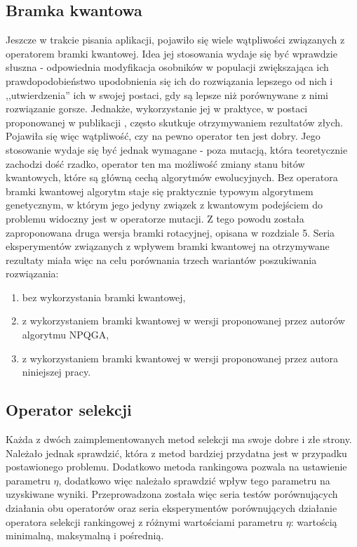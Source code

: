 \subsection{Bramka kwantowa}
Jeszcze w trakcie pisania aplikacji, pojawiło się wiele wątpliwości związanych z operatorem bramki kwantowej. Idea jej stosowania wydaje się być wprawdzie słuszna - odpowiednia modyfikacja osobników w populacji zwiększająca ich prawdopodobieństwo upodobnienia się ich do rozwiązania lepszego od nich i ,,utwierdzenia'' ich w swojej postaci, gdy są lepsze niż porównywane z nimi rozwiązanie gorsze. Jednakże, wykorzystanie jej w praktyce, w postaci proponowanej w publikacji \cite{NPQGA}, często skutkuje otrzymywaniem rezultatów złych. Pojawiła się więc wątpliwość, czy na pewno operator ten jest dobry. Jego stosowanie wydaje się być jednak wymagane - poza mutacją, która teoretycznie zachodzi dość rzadko, operator ten ma możliwość zmiany stanu bitów kwantowych, które są główną cechą algorytmów ewolucyjnych. Bez operatora bramki kwantowej algorytm staje się praktycznie typowym algorytmem genetycznym, w którym jego jedyny związek z kwantowym podejściem do problemu widoczny jest w operatorze mutacji. Z tego powodu została zaproponowana druga wersja bramki rotacyjnej, opisana w rozdziale 5. Seria eksperymentów związanych z wpływem bramki kwantowej na otrzymywane rezultaty miała więc na celu porównania trzech wariantów poszukiwania rozwiązania:
\begin{enumerate}
\item bez wykorzystania bramki kwantowej,
\item z wykorzystaniem bramki kwantowej w wersji proponowanej przez autorów algorytmu NPQGA,
\item z wykorzystaniem bramki kwantowej w wersji proponowanej przez autora niniejszej pracy. 
\end{enumerate}

\subsection{Operator selekcji}
Każda z dwóch zaimplementowanych metod selekcji ma swoje dobre i złe strony. Należało jednak sprawdzić, która z metod bardziej przydatna jest w przypadku postawionego problemu. Dodatkowo metoda rankingowa pozwala na ustawienie parametru $\eta$, dodatkowo więc należało sprawdzić wpływ tego parametru na uzyskiwane wyniki. Przeprowadzona została więc seria testów porównujących działania obu operatorów oraz seria eksperymentów porównujących działanie operatora selekcji rankingowej z różnymi wartościami parametru $\eta$: wartością minimalną, maksymalną i pośrednią. 

